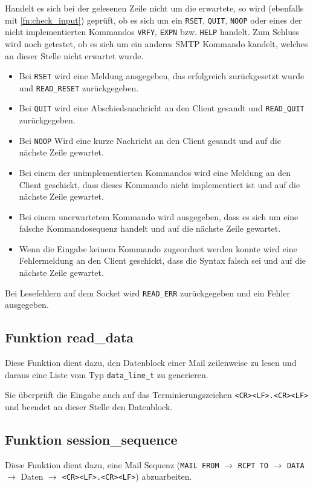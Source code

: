 \documentclass[pdftex,final,a4paper,10pt,notitlepage,halfparskip]{scrreprt}
\begin{document}
Handelt es sich bei der gelesenen Zeile nicht um die erwartete, so wird (ebenfalls mit \ref{fn:check_input}) geprüft, ob es sich um ein \texttt{RSET}, \texttt{QUIT}, \texttt{NOOP} oder eines der nicht implementierten Kommandos \texttt{VRFY}, \texttt{EXPN} bzw. \texttt{HELP} handelt. Zum Schluss wird noch getestet, ob es sich um ein anderes SMTP Kommando kandelt, welches an dieser Stelle nicht erwartet wurde.
\begin{itemize}
  \item Bei \texttt{RSET} wird eine Meldung ausgegeben, das erfolgreich zurückgesetzt wurde und \texttt{READ\_RESET} zurückgegeben. 
  \item Bei \texttt{QUIT} wird eine Abschiedsnachricht an den Client gesandt und \texttt{READ\_QUIT} zurückgegeben. 
  \item Bei \texttt{NOOP} Wird eine kurze Nachricht an den Client gesandt und auf die nächste Zeile gewartet.
  \item Bei einem der unimplementierten Kommandos wird eine Meldung an den Client geschickt, dass dieses Kommando nicht implementiert ist und auf die nächste Zeile gewartet.
  \item Bei einem unerwartetem Kommando wird ausgegeben, dass es sich um eine  falsche Kommandosequenz handelt und auf die nächste Zeile gewartet.
  \item Wenn die Eingabe keinem Kommando zugeordnet werden konnte wird eine Fehlermeldung an den Client geschickt, dass die Syntax falsch sei und auf die nächste Zeile gewartet. 
\end{itemize}

Bei Lesefehlern auf dem Socket wird \texttt{READ\_ERR} zurückgegeben und ein Fehler ausgegeben.

\subsection{Funktion read\_data}\label{fn:read_data}
Diese Funktion dient dazu, den Datenblock einer Mail zeilenweise zu lesen und daraus eine Liste vom Typ \texttt{data\_line\_t} zu generieren.

Sie überprüft die Eingabe auch auf das Terminierungszeichen \texttt{<CR><LF>.<CR><LF>} und beendet an dieser Stelle den Datenblock.


\subsection{Funktion session\_sequence}\label{fn:session_sequence}
Diese Funktion dient dazu, eine Mail Sequenz (\texttt{MAIL FROM} $\rightarrow$ \texttt{RCPT TO} $\rightarrow$ \texttt{DATA} $\rightarrow$ Daten $\rightarrow$ \texttt{<CR><LF>.<CR><LF>}) abzuarbeiten.
\end{document}
